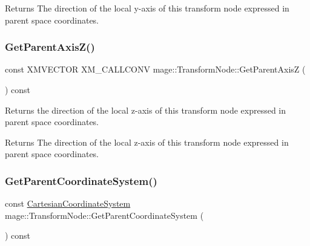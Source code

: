 \begin{DoxyReturn}{Returns}
The direction of the local y-\/axis of this transform node expressed in parent space coordinates. 
\end{DoxyReturn}
\hypertarget{classmage_1_1_transform_node_a2683397fc2af734026baeab2125f0096}{}\label{classmage_1_1_transform_node_a2683397fc2af734026baeab2125f0096} 
\subsubsection{\texorpdfstring{Get\+Parent\+Axis\+Z()}{GetParentAxisZ()}}
{\footnotesize\ttfamily const X\+M\+V\+E\+C\+T\+OR X\+M\+\_\+\+C\+A\+L\+L\+C\+O\+NV mage\+::\+Transform\+Node\+::\+Get\+Parent\+AxisZ (\begin{DoxyParamCaption}{ }\end{DoxyParamCaption}) const\hspace{0.3cm}{\ttfamily [noexcept]}}

Returns the direction of the local z-\/axis of this transform node expressed in parent space coordinates.

\begin{DoxyReturn}{Returns}
The direction of the local z-\/axis of this transform node expressed in parent space coordinates. 
\end{DoxyReturn}
\hypertarget{classmage_1_1_transform_node_af99de109dd3e211fdc5f06a65ccc1e89}{}\label{classmage_1_1_transform_node_af99de109dd3e211fdc5f06a65ccc1e89} 
\subsubsection{\texorpdfstring{Get\+Parent\+Coordinate\+System()}{GetParentCoordinateSystem()}}
{\footnotesize\ttfamily const \hyperlink{structmage_1_1_cartesian_coordinate_system}{Cartesian\+Coordinate\+System} mage\+::\+Transform\+Node\+::\+Get\+Parent\+Coordinate\+System (\begin{DoxyParamCaption}{ }\end{DoxyParamCaption}) const\hspace{0.3cm}{\ttfamily [noexcept]}}

